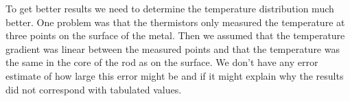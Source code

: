 To get better results we need to determine the temperature distribution much better.
One problem was that the thermistors only measured the temperature at three points on the surface of the metal. Then we assumed that the temperature gradient was linear between the measured points and that the temperature was the same in the core of the rod as on the surface. We don't have any error estimate of how large this error might be and if it might explain why the results did not correspond with tabulated values.